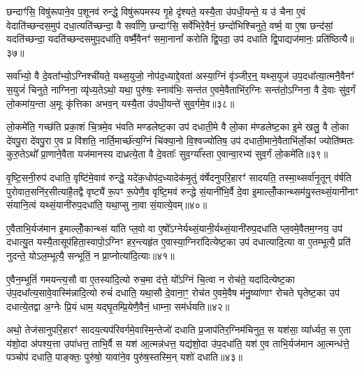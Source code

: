 छन्दाꣳ॑सि॒ विषु॑रूपाने॒व प॒शूनव॑ रुन्द्धे॒ विषु॑रूपमस्य गृ॒हे दृ॑श्यते॒ यस्यै॒ता उ॑पधी॒यन्ते॒ य उ॑ चैना ए॒वं वेदाति॑च्छन्दस॒मुप॑ दधा॒त्यति॑च्छन्दा॒ वै सर्वा॑णि॒ छन्दाꣳ॑सि॒ सर्वे॑भिरे॒वैनं॒ छन्दो॑भिश्चिनुते॒ वर्ष्म॒ वा ए॒षा छन्द॑सां॒ यदति॑च्छन्दा॒ यदति॑च्छन्दसमुप॒दधा॑ति॒ वर्ष्मै॒वैनꣳ॑ समा॒नानां᳚ करोति द्वि॒पदा॒ उप॑ दधाति द्वि॒पाद्यज॑मानः॒ प्रति॑ष्ठित्यै॥३७॥

{\anuvakamend[{तेज॑ ए॒व प॒शवः॑ प॒शवो॒ यज॑मान॒ एक॑ञ्च॥८॥}]}

सर्वा᳚भ्यो॒ वै दे॒वता᳚भ्यो॒\-ऽग्निश्ची॑यते॒ यथ्स॒युजो॒ नोप॑द॒ध्याद्दे॒वता॑ अस्या॒ग्निं वृ॑ञ्जीर॒न्॒ यथ्स॒युज॑ उप॒दधा᳚त्या॒त्मनै॒वैनꣳ॑ स॒युजं॑ चिनुते॒ नाग्निना॒ व्यृ॑ध्य॒ते\-ऽथो॒ यथा॒ पुरु॑षः॒ स्नाव॑भिः॒ सन्त॑त ए॒वमे॒वैताभि॑र॒ग्निः सन्त॑तो॒\-ऽग्निना॒ वै दे॒वाः सु॑व॒र्गं लो॒कमा॑य॒न्ता अ॒मूः कृ॑त्तिका अभव॒न् यस्यै॒ता उ॑पधी॒यन्ते॑ सुव॒र्गमे॒व॥३८॥

लो॒कमे॑ति॒ गच्छ॑ति प्रका॒शं चि॒त्रमे॒व भ॑वति मण्डलेष्ट॒का उप॑ दधाती॒मे वै लो॒का म॑ण्डलेष्ट॒का इ॒मे खलु॒ वै लो॒का दे॑वपु॒रा दे॑वपु॒रा ए॒व प्र वि॑शति॒ नार्ति॒मार्च्छ॑त्य॒ग्निं चि॑क्या॒नो वि॒श्वज्यो॑तिष॒ उप॑ दधाती॒माने॒वैताभि॑र्लो॒कां ज्योति॑ष्मतः कुरु॒ते\-ऽथो᳚ प्रा॒णाने॒वैता यज॑मानस्य दाध्रत्ये॒ता वै दे॒वताः᳚ सुव॒र्ग्या᳚स्ता ए॒वान्वा॒रभ्य॑ सुव॒र्गं लो॒कमे॑ति॥३९॥

{\anuvakamend[{सु॒व॒र्गमे॒व ता ए॒व च॒त्वारि॑ च॥९॥}]}

वृ॒ष्टि॒सनी॒रुप॑ दधाति॒ वृष्टि॑मे॒वाव॑ रुन्द्धे॒ यदे॑क॒धोप॑द॒ध्यादेक॑मृ॒तुं व॑र्\mbox{}षेदनुपरि॒हारꣳ॑ सादयति॒ तस्मा॒थ्सर्वा॑नृ॒तून् व॑र्\mbox{}षति पुरोवात॒सनि॑र॒सीत्या॑है॒तद्वै वृष्ट्यै॑ रू॒पꣳ रू॒पेणै॒व वृष्टि॒मव॑ रुन्द्धे सं॒यानी॑भि॒र्वै दे॒वा इ॒माल्लोँ॒कान्थ्सम॑यु॒स्तथ्सं॒यानी॑नाꣳ संयानि॒त्वं यथ्सं॒यानी॑रुप॒दधा॑ति॒ यथा॒प्सु ना॒वा सं॒यात्ये॒वम्॥४०॥

ए॒वैताभि॒र्यज॑मान इ॒माल्लोँ॒कान्थ्सं या॑ति प्ल॒वो वा ए॒षो᳚\-ऽग्नेर्यथ्सं॒यानी॒र्यथ्सं॒यानी॑रुप॒दधा॑ति प्ल॒वमे॒वैतम॒ग्नय॒ उप॑ दधात्यु॒त यस्यै॒तासूप॑हिता॒स्वापो॒\-ऽग्निꣳ हर॒न्त्यहृ॑त ए॒वास्या॒ग्निरा॑दित्येष्ट॒का उप॑ दधात्यादि॒त्या वा ए॒तम्भूत्यै॒ प्रति॑ नुदन्ते॒ यो\-ऽल॒म्भूत्यै॒ सन्भूतिं॒ न प्रा॒प्नोत्या॑दि॒त्याः॥४१॥

ए॒वैन॒म्भूतिं॑ गमयन्त्य॒सौ वा ए॒तस्या॑दि॒त्यो रुच॒मा द॑त्ते॒ यो᳚\-ऽग्निं चि॒त्वा न रोच॑ते॒ यदा॑दित्येष्ट॒का उ॑प॒दधा᳚त्य॒सावे॒वास्मि॑न्नादि॒त्यो रुचं॑ दधाति॒ यथा॒सौ दे॒वाना॒ꣳ॒ रोच॑त ए॒वमे॒वैष म॑नु॒ष्या॑णाꣳ रोचते घृतेष्ट॒का उप॑ दधात्ये॒तद्वा अ॒ग्नेः प्रि॒यं धाम॒ यद्घृ॒तम्प्रि॒येणै॒वैनं॒ धाम्ना॒ सम॑र्धयति॥४२॥

अथो॒ तेज॑सानुपरि॒हारꣳ॑ सादय॒त्यप॑रिवर्गमे॒वास्मि॒न्तेजो॑ दधाति प्र॒जाप॑तिर॒ग्निम॑चिनुत॒ स यश॑सा॒ व्या᳚र्ध्यत॒ स ए॒ता य॑शो॒दा अ॑पश्य॒त्ता उपा॑धत्त॒ ताभि॒र्वै स यश॑ आ॒त्मन्न॑धत्त॒ यद्य॑शो॒दा उ॑प॒दधा॑ति॒ यश॑ ए॒व ताभि॒र्यज॑मान आ॒त्मन्ध॑त्ते॒ पञ्चोप॑ दधाति॒ पाङ्क्तः॒ पुरु॑षो॒ यावा॑ने॒व पुरु॑ष॒स्तस्मि॒न् यशो॑ दधाति॥४३॥

